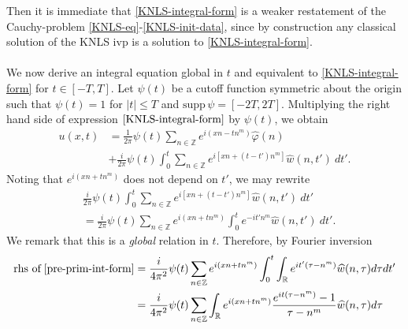 \documentclass[12pt,reqno]{amsart}
\numberwithin{equation}{section}  %
\numberwithin{figure}{section}
\newcommand{\rr}{\mathbb{R}}
\newcommand{\zz}{\mathbb{Z}}
\newcommand{\wh}{\widehat}
\newcommand{\vp}{\varphi}
\theoremstyle{plain}
\theoremstyle{definition}
\theoremstyle{remark}
\begin{document}
%
%
Then it is immediate that \eqref{KNLS-integral-form} is a weaker 
restatement of the Cauchy-problem \eqref{KNLS-eq}-\eqref{KNLS-init-data}, 
since by construction any classical solution of the KNLS 
ivp is a solution to \eqref{KNLS-integral-form}. 
\\
\\
%
%
We now derive an integral 
equation global in $t$ and equivalent to \eqref{KNLS-integral-form} for $t 
\in [-T, T]$. Let $\psi(t)$ be a cutoff function symmetric about the 
origin such that $\psi(t) = 1$ for $|t| \le T$ and $\text{supp} \, \psi 
= [-2T, 2T ]$. Multiplying the right hand side of expression
$\eqref{KNLS-integral-form}$ by $\psi(t)$, we obtain
%
%
\begin{equation}
	\begin{split}
		\label{cutoff-int-eq}
		u(x, t)
		& = \frac{1}{2 \pi} \psi(t) \sum_{n \in \zz} e^{i(xn - t n^{m })} \widehat{\vp}(n) 
		\\
		& + \frac{i }{2 \pi} \psi(t) \int_0^t \sum_{n \in \zz} 
		e^{i\left[ xn + (t - t')n^m \right]} \wh{w}(n, t') \ dt'.
	\end{split}
\end{equation}
%
%
Noting that $e^{i\left( xn + tn^{m } \right)}$ 
does not depend on $t'$, we may rewrite
%
%
\begin{equation}
	\label{pre-prim-int-form}
	\begin{split}
		& \frac{i }{2 \pi} \psi(t) \int_0^t \sum_{n \in \zz} 
		e^{i\left[ xn + (t - t') n^m \right]} \wh{w}(n, t') \ dt'
		\\
		& = \frac{i}{2 \pi} \psi(t) \sum_{n \in \zz} e^{i\left( xn + t 
		 n^{m } 
		\right)} \int_0^t e^{- it'n^{m }} \wh{w}(n, t') \ dt'.
	\end{split}
\end{equation}
We remark that this is a \emph{global} relation in $t$. Therefore, by Fourier 
inversion
%
%
%
%
%
%
%
\begin{equation*}
	\begin{split}
		\text{rhs of} \; \eqref{pre-prim-int-form}
		& = \frac{i}{4 \pi^2} \psi (t) \sum_{n \in \zz} e^{i\left( xn + t 
		 n^m
		\right)} \int_0^t \int_\rr e^{it'\left( \tau - n^m \right) }
		\wh{w}(n, \tau) d \tau dt'
		\\
		& = \frac{i}{4 \pi^2} \psi(t) \sum_{n \in \zz} \int_\rr 
		e^{i\left( xn + tn^m \right)} \frac{e^{it\left( \tau - n^m 
		\right)}-1}{\tau - n^m} \wh{w}(n, \tau) d \tau
	\end{split}
\end{equation*}
\end{document}
